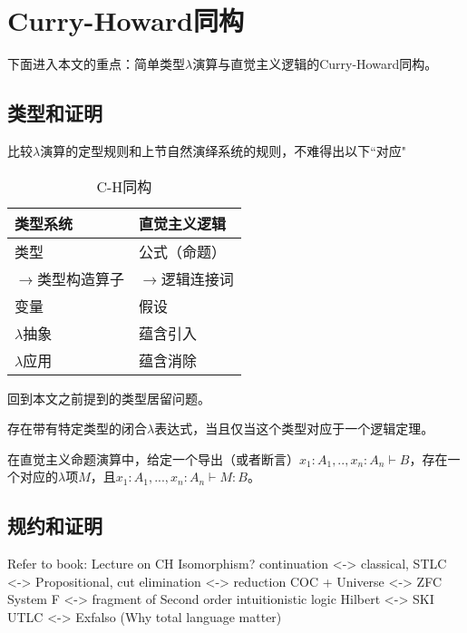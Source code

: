 \section{Curry-Howard同构}


下面进入本文的重点：简单类型$\lambda$演算与直觉主义逻辑的Curry-Howard同构。


\subsection{类型和证明}

比较$\lambda$演算的定型规则和上节自然演绎系统的规则，不难得出以下``对应"

\begin{table}[!htb]
\centering
\caption{C-H同构}
\label{my-label}
\begin{tabular}{|l|l|}
\hline
\textbf{类型系统} & \textbf{直觉主义逻辑} \\ \hline
类型            & 公式（命题）            \\ \hline
$\to$类型构造算子        & $\to$逻辑连接词   \\ \hline
变量                        & 假设                  \\ \hline
$\lambda$抽象            & 蕴含引入              \\ \hline
$\lambda$应用            & 蕴含消除              \\ \hline
\end{tabular}
\end{table}


回到本文之前提到的类型居留问题。

\begin{thm}

存在带有特定类型的闭合$\lambda$表达式，当且仅当这个类型对应于一个逻辑定理。
\end{thm}

在直觉主义命题演算中，给定一个导出（或者断言）$x_1:A_1, .., x_n:A_n \vdash B$，存在一个对应的$\lambda$项$M$，且$x_1:A_1,...,x_n:A_n \vdash M : B$。





\subsection{规约和证明}


Refer to book: Lecture on CH Isomorphism?
continuation <-> classical, 
STLC <-> Propositional,
cut elimination <-> reduction
COC + Universe <-> ZFC
System F <-> fragment of Second order intuitionistic logic
Hilbert <-> SKI
UTLC <-> Exfalso (Why total language matter)

